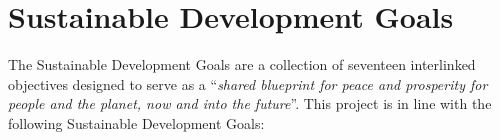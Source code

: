 % 
% 
% 





\chapter{Sustainable Development Goals}

The Sustainable Development Goals are a collection of seventeen interlinked objectives designed to serve as a ``\textit{shared blueprint for peace and prosperity for people and the planet, now and into the future}''. This project is in line with the following Sustainable Development Goals:




